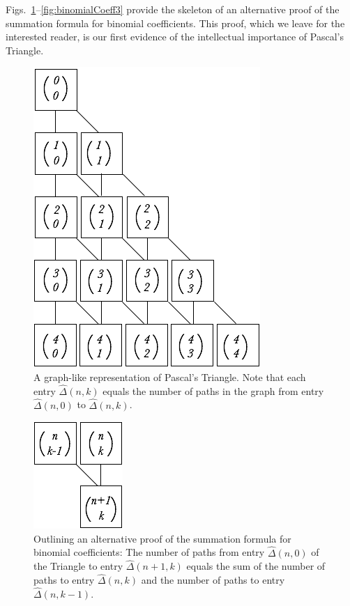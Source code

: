 Figs.~\ref{fig:binomialCoeff1}--\ref{fig:binomialCoeff3} provide the skeleton of an alternative proof of the summation formula for binomial coefficients.  This proof, which we leave for the interested reader, is our first evidence of the intellectual importance of Pascal's Triangle.
\begin{figure}[htb]
\begin{center}
       \includegraphics[scale=0.4]{FiguresMaths/CoeffBinomiaux1}
\caption{A graph-like representation of Pascal's Triangle.  Note that each entry $\hat{\Delta}(n, k)$ equals the number of paths in the graph from entry $\hat{\Delta}(n, 0)$ to $\hat{\Delta}(n, k)$.}
\label{fig:binomialCoeff1}
\end{center}
\end{figure}

\begin{figure}[htb]
\begin{center}
       \includegraphics[scale=0.4]{FiguresMaths/CoeffBinomiaux2}
\caption{Outlining an alternative proof of the summation formula for binomial coefficients:  The number of paths from entry $\hat{\Delta}(n, 0)$ of the Triangle to entry $\hat{\Delta}(n+1, k)$  equals the sum of the number of paths to entry $\hat{\Delta}(n, k)$ and the number of paths to entry $\hat{\Delta}(n, k-1)$.}
\label{fig:binomialCoeff2}
\end{center}
\end{figure}

